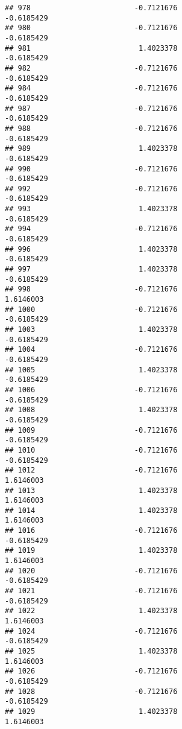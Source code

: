 \documentclass[
]{article}
\begin{document}
\begin{verbatim}
## 978                        -0.7121676                       -0.6185429
## 980                        -0.7121676                       -0.6185429
## 981                         1.4023378                       -0.6185429
## 982                        -0.7121676                       -0.6185429
## 984                        -0.7121676                       -0.6185429
## 987                        -0.7121676                       -0.6185429
## 988                        -0.7121676                       -0.6185429
## 989                         1.4023378                       -0.6185429
## 990                        -0.7121676                       -0.6185429
## 992                        -0.7121676                       -0.6185429
## 993                         1.4023378                       -0.6185429
## 994                        -0.7121676                       -0.6185429
## 996                         1.4023378                       -0.6185429
## 997                         1.4023378                       -0.6185429
## 998                        -0.7121676                        1.6146003
## 1000                       -0.7121676                       -0.6185429
## 1003                        1.4023378                       -0.6185429
## 1004                       -0.7121676                       -0.6185429
## 1005                        1.4023378                       -0.6185429
## 1006                       -0.7121676                       -0.6185429
## 1008                        1.4023378                       -0.6185429
## 1009                       -0.7121676                       -0.6185429
## 1010                       -0.7121676                       -0.6185429
## 1012                       -0.7121676                        1.6146003
## 1013                        1.4023378                        1.6146003
## 1014                        1.4023378                        1.6146003
## 1016                       -0.7121676                       -0.6185429
## 1019                        1.4023378                        1.6146003
## 1020                       -0.7121676                       -0.6185429
## 1021                       -0.7121676                       -0.6185429
## 1022                        1.4023378                        1.6146003
## 1024                       -0.7121676                       -0.6185429
## 1025                        1.4023378                        1.6146003
## 1026                       -0.7121676                       -0.6185429
## 1028                       -0.7121676                       -0.6185429
## 1029                        1.4023378                        1.6146003

\end{verbatim}
\end{document}

